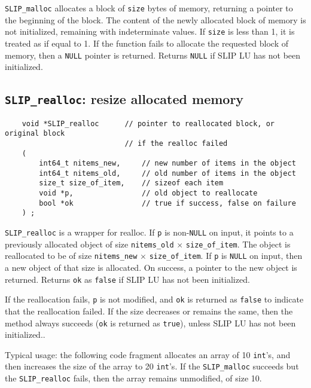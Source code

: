 \documentclass[12pt]{article}
\theoremstyle{definition}
\begin{document}
\verb|SLIP_malloc| allocates a block of \verb|size| bytes of memory, returning
a pointer to the beginning of the block. The content of the newly allocated
block of memory is not initialized, remaining with indeterminate values.
If \verb|size| is less than 1, it is treated as if equal to 1. If the function
fails to allocate the requested block of memory, then a \verb|NULL| pointer is
returned.
Returns \verb|NULL| if SLIP LU has not been initialized.

\cprotect\subsection{\verb|SLIP_realloc|: resize allocated memory}
\label{ss:SLIP_realloc}

\begin{mdframed}[userdefinedwidth=6in]
{\footnotesize
\begin{verbatim}
    void *SLIP_realloc      // pointer to reallocated block, or original block
                            // if the realloc failed
    (
        int64_t nitems_new,     // new number of items in the object
        int64_t nitems_old,     // old number of items in the object
        size_t size_of_item,    // sizeof each item
        void *p,                // old object to reallocate
        bool *ok                // true if success, false on failure
    ) ;
\end{verbatim}
} \end{mdframed}

\verb|SLIP_realloc| is a wrapper for realloc.  If \verb|p| is non-\verb|NULL| on
input, it points to a previously allocated object of size \verb|nitems_old|
$\times$ \verb|size_of_item|.  The object is reallocated to be of size
\verb|nitems_new| $\times$ \verb|size_of_item|.  If \verb|p| is \verb|NULL| on input,
then a new object of that size is allocated.  On success, a pointer to the new
object is returned.  Returns \verb|ok| as \verb|false| if SLIP LU has not been
initialized.

If the reallocation fails, \verb|p| is not modified, and \verb|ok| is returned
as \verb|false| to indicate that the reallocation failed.  If the size
decreases or remains the same, then the method always succeeds (\verb|ok| is
returned as \verb|true|), unless SLIP LU has not been initialized..

Typical usage:  the following code fragment allocates an array of 10
\verb|int|'s, and then increases the size of the array to 20 \verb|int|'s.  If
the \verb|SLIP_malloc| succeeds but the \verb|SLIP_realloc| fails, then the
array remains unmodified, of size 10.
\end{document}
